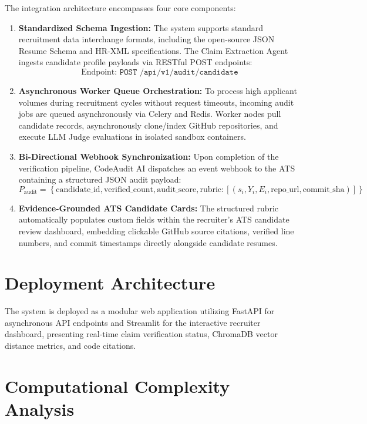 The integration architecture encompasses four core components:
\begin{enumerate}[leftmargin=*, label=\arabic*.]
    \item \textbf{Standardized Schema Ingestion:} The system supports standard recruitment data interchange formats, including the open-source JSON Resume Schema and HR-XML specifications. The Claim Extraction Agent ingests candidate profile payloads via RESTful POST endpoints:
    \begin{equation}
    \text{Endpoint: } \texttt{POST /api/v1/audit/candidate}
    \end{equation}
    \item \textbf{Asynchronous Worker Queue Orchestration:} To process high applicant volumes during recruitment cycles without request timeouts, incoming audit jobs are queued asynchronously via Celery and Redis. Worker nodes pull candidate records, asynchronously clone/index GitHub repositories, and execute LLM Judge evaluations in isolated sandbox containers.
    \item \textbf{Bi-Directional Webhook Synchronization:} Upon completion of the verification pipeline, CodeAudit AI dispatches an event webhook to the ATS containing a structured JSON audit payload:
    \begin{equation}
    P_{\text{audit}} = \left\{ \text{candidate\_id}, \text{verified\_count}, \text{audit\_score}, \text{rubric}: [ (s_i, Y_i, E_i, \text{repo\_url}, \text{commit\_sha}) ] \right\}
    \end{equation}
    \item \textbf{Evidence-Grounded ATS Candidate Cards:} The structured rubric automatically populates custom fields within the recruiter's ATS candidate review dashboard, embedding clickable GitHub source citations, verified line numbers, and commit timestamps directly alongside candidate resumes.
\end{enumerate}

\section{Deployment Architecture}

The system is deployed as a modular web application utilizing FastAPI for asynchronous API endpoints and Streamlit \cite{ref49} for the interactive recruiter dashboard, presenting real-time claim verification status, ChromaDB vector distance metrics, and code citations.

\section{Computational Complexity Analysis}

